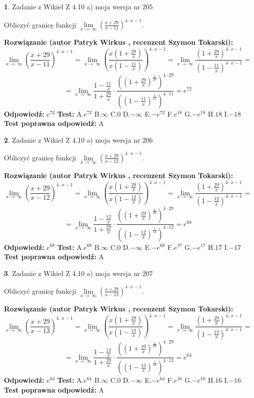 \documentclass[12pt, a4paper]{article}
\theoremstyle{definition} %
\newtheorem{zad}{}
\newcommand{\zadStart}[1]{\begin{zad}#1\newline}
\newcommand{\zadStop}{\end{zad}}
\newcommand{\rozwStart}[2]{\noindent \textbf{Rozwiązanie (autor #1 , recenzent #2): }\newline}
\newcommand{\rozwStop}{\newline}
\newcommand{\odpStart}{\noindent \textbf{Odpowiedź:}\newline}
\newcommand{\odpStop}{\newline}
\newcommand{\testStart}{\noindent \textbf{Test:}\newline}
\newcommand{\testStop}{\newline}
\newcommand{\kluczStart}{\noindent \textbf{Test poprawna odpowiedź:}\newline}
\newcommand{\kluczStop}{\newline}
\begin{document}
\zadStart{Zadanie z Wikieł Z 4.10 a) moja wersja nr 205}

Obliczyć granicę funkcji  $\lim\limits_{x\to\ \infty}(\frac{x+29}{x-11})^{4\cdot x-1}$.
\zadStop
\rozwStart{Patryk Wirkus}{Szymon Tokarski}
$$\lim\limits_{x\to\ \infty}(\frac{x+29}{x-11})^{4\cdot x-1} = \lim\limits_{x\to\ \infty}(\frac{x(1+\frac{29}{x})}{x(1-\frac{11}{x})})^{4\cdot x-1}=\lim\limits_{x\to\ \infty}\frac{(1+\frac{29}{x})^{4\cdot x-1}}{(1-\frac{11}{x})^{4\cdot x-1}}=$$
$$=\lim\limits_{x\to\ \infty}\frac{1-\frac{11}{x}}{1+\frac{29}{x}}\cdot\frac{((1+\frac{29}{x})^{\frac{x}{29}})^{4\cdot29}}{((1-\frac{11}{x})^{\frac{x}{11}})^{4\cdot11}}=e^{72}$$
\rozwStop
\odpStart
$e^{72}$
\odpStop
\testStart
A.$e^{72}$ B.$\infty$ C.$0$ D.$-\infty$ E.$-e^{72}$
F.$e^{18}$ G.$-e^{18}$
H.$18$
I.$-18$
\testStop
\kluczStart
A
\kluczStop



\zadStart{Zadanie z Wikieł Z 4.10 a) moja wersja nr 206}

Obliczyć granicę funkcji  $\lim\limits_{x\to\ \infty}(\frac{x+29}{x-12})^{4\cdot x-1}$.
\zadStop
\rozwStart{Patryk Wirkus}{Szymon Tokarski}
$$\lim\limits_{x\to\ \infty}(\frac{x+29}{x-12})^{4\cdot x-1} = \lim\limits_{x\to\ \infty}(\frac{x(1+\frac{29}{x})}{x(1-\frac{12}{x})})^{4\cdot x-1}=\lim\limits_{x\to\ \infty}\frac{(1+\frac{29}{x})^{4\cdot x-1}}{(1-\frac{12}{x})^{4\cdot x-1}}=$$
$$=\lim\limits_{x\to\ \infty}\frac{1-\frac{12}{x}}{1+\frac{29}{x}}\cdot\frac{((1+\frac{29}{x})^{\frac{x}{29}})^{4\cdot29}}{((1-\frac{12}{x})^{\frac{x}{12}})^{4\cdot12}}=e^{68}$$
\rozwStop
\odpStart
$e^{68}$
\odpStop
\testStart
A.$e^{68}$ B.$\infty$ C.$0$ D.$-\infty$ E.$-e^{68}$
F.$e^{17}$ G.$-e^{17}$
H.$17$
I.$-17$
\testStop
\kluczStart
A
\kluczStop



\zadStart{Zadanie z Wikieł Z 4.10 a) moja wersja nr 207}

Obliczyć granicę funkcji  $\lim\limits_{x\to\ \infty}(\frac{x+29}{x-13})^{4\cdot x-1}$.
\zadStop
\rozwStart{Patryk Wirkus}{Szymon Tokarski}
$$\lim\limits_{x\to\ \infty}(\frac{x+29}{x-13})^{4\cdot x-1} = \lim\limits_{x\to\ \infty}(\frac{x(1+\frac{29}{x})}{x(1-\frac{13}{x})})^{4\cdot x-1}=\lim\limits_{x\to\ \infty}\frac{(1+\frac{29}{x})^{4\cdot x-1}}{(1-\frac{13}{x})^{4\cdot x-1}}=$$
$$=\lim\limits_{x\to\ \infty}\frac{1-\frac{13}{x}}{1+\frac{29}{x}}\cdot\frac{((1+\frac{29}{x})^{\frac{x}{29}})^{4\cdot29}}{((1-\frac{13}{x})^{\frac{x}{13}})^{4\cdot13}}=e^{64}$$
\rozwStop
\odpStart
$e^{64}$
\odpStop
\testStart
A.$e^{64}$ B.$\infty$ C.$0$ D.$-\infty$ E.$-e^{64}$
F.$e^{16}$ G.$-e^{16}$
H.$16$
I.$-16$
\testStop
\kluczStart
A
\kluczStop
\end{document}
